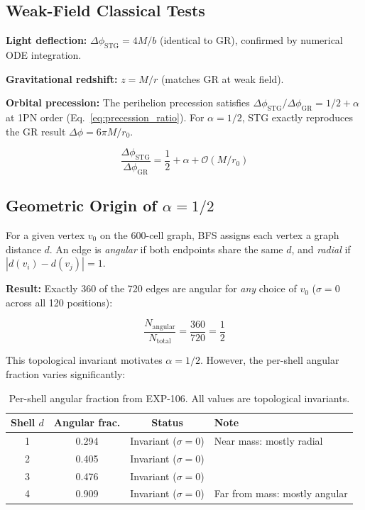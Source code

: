 \documentclass[12pt,a4paper]{article}
\begin{document}
\subsection{Weak-Field Classical Tests}

\textbf{Light deflection:} $\Delta\phi_{\text{STG}} = 4M/b$ (identical to GR), confirmed by numerical ODE integration.

\textbf{Gravitational redshift:} $z = M/r$ (matches GR at weak field).

\textbf{Orbital precession:} The perihelion precession satisfies $\Delta\phi_{\text{STG}}/\Delta\phi_{\text{GR}} = 1/2 + \alpha$ at 1PN order (Eq.~\ref{eq:precession_ratio}). For $\alpha = 1/2$, STG exactly reproduces the GR result $\Delta\phi = 6\pi M/r_0$.

\begin{equation}
\frac{\Delta\phi_{\text{STG}}}{\Delta\phi_{\text{GR}}} = \frac{1}{2} + \alpha + \mathcal{O}(M/r_0)
\label{eq:precession_ratio}
\end{equation}

\subsection{Geometric Origin of $\alpha = 1/2$}

For a given vertex $v_0$ on the 600-cell graph, BFS assigns each vertex a graph distance $d$. An edge is \emph{angular} if both endpoints share the same $d$, and \emph{radial} if $|d(v_i) - d(v_j)| = 1$.

\textbf{Result:} Exactly 360 of the 720 edges are angular for \emph{any} choice of $v_0$ ($\sigma = 0$ across all 120 positions):

\begin{equation}
\boxed{\frac{N_{\text{angular}}}{N_{\text{total}}} = \frac{360}{720} = \frac{1}{2}}
\label{eq:angular_half}
\end{equation}

This topological invariant motivates $\alpha = 1/2$. However, the per-shell angular fraction varies significantly:

\begin{table}[H]
\centering
\begin{tabular}{cccl}
\toprule
\textbf{Shell $d$} & \textbf{Angular frac.} & \textbf{Status} & \textbf{Note} \\
\midrule
1 & 0.294 & Invariant ($\sigma = 0$) & Near mass: mostly radial \\
2 & 0.405 & Invariant ($\sigma = 0$) & \\
3 & 0.476 & Invariant ($\sigma = 0$) & \\
4 & 0.909 & Invariant ($\sigma = 0$) & Far from mass: mostly angular \\
\bottomrule
\end{tabular}
\caption{Per-shell angular fraction from EXP-106. All values are topological invariants.}
\end{table}
\end{document}
